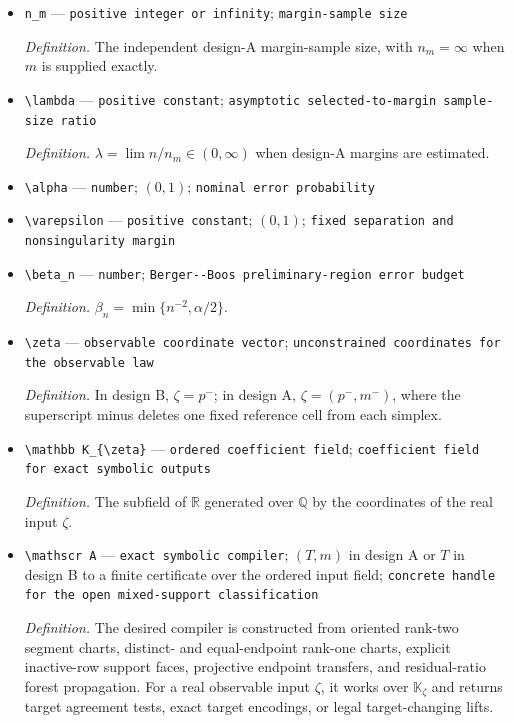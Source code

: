 \documentclass{article}
\begin{document}
\begin{itemize}
  \item \texttt{n\_\allowbreak{}m} --- \texttt{positive integer or infinity}; \texttt{margin-\allowbreak{}sample size}
  \par\smallskip\noindent\emph{Definition.} The independent design-A margin-sample size, with \(n_m=\infty\) when \(m\) is supplied exactly.
  \item \texttt{\textbackslash{}\allowbreak{}lambda} --- \texttt{positive constant}; \texttt{asymptotic selected-\allowbreak{}to-\allowbreak{}margin sample-\allowbreak{}size ratio}
  \par\smallskip\noindent\emph{Definition.} \(\lambda=\lim n/n_m\in(0,\infty)\) when design-A margins are estimated.
  \item \texttt{\textbackslash{}\allowbreak{}alpha} --- \texttt{number}; \((0,1)\); \texttt{nominal error probability}
  \item \texttt{\textbackslash{}\allowbreak{}varepsilon} --- \texttt{positive constant}; \((0,1)\); \texttt{fixed separation and nonsingularity margin}
  \item \texttt{\textbackslash{}\allowbreak{}beta\_\allowbreak{}n} --- \texttt{number}; \texttt{Berger-\allowbreak{}-\allowbreak{}Boos preliminary-\allowbreak{}region error budget}
  \par\smallskip\noindent\emph{Definition.} \(\beta_n=\min\{n^{-2},\alpha/2\}\).
  \item \texttt{\textbackslash{}\allowbreak{}zeta} --- \texttt{observable coordinate vector}; \texttt{unconstrained coordinates for the observable law}
  \par\smallskip\noindent\emph{Definition.} In design B, \(\zeta=p^{-}\); in design A, \(\zeta=(p^{-},m^{-})\), where the superscript minus deletes one fixed reference cell from each simplex.
  \item \texttt{\textbackslash{}\allowbreak{}mathbb K\_\allowbreak{}\{\textbackslash{}\allowbreak{}zeta\}\allowbreak{}} --- \texttt{ordered coefficient field}; \texttt{coefficient field for exact symbolic outputs}
  \par\smallskip\noindent\emph{Definition.} The subfield of \(\mathbb R\) generated over \(\mathbb Q\) by the coordinates of the real input \(\zeta\).
  \item \texttt{\textbackslash{}\allowbreak{}mathscr A} --- \texttt{exact symbolic compiler}; \((T,m)\) in design A or \(T\) in design B to a finite certificate over the ordered input field; \texttt{concrete handle for the open mixed-\allowbreak{}support classification}
  \par\smallskip\noindent\emph{Definition.} The desired compiler is constructed from oriented rank-two segment charts, distinct- and equal-endpoint rank-one charts, explicit inactive-row support faces, projective endpoint transfers, and residual-ratio forest propagation. For a real observable input \(\zeta\), it works over \(\mathbb K_{\zeta}\) and returns target agreement tests, exact target encodings, or legal target-changing lifts.

\end{itemize}
\end{document}

